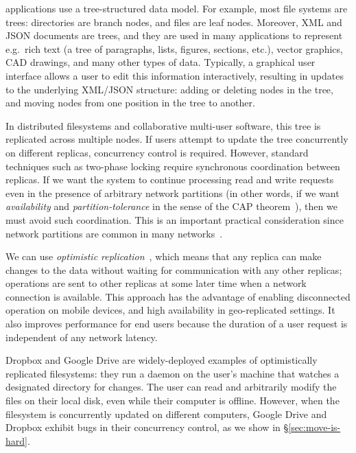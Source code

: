 \documentclass[10pt,journal,compsoc]{IEEEtran}
\begin{document}

 applications use a tree-structured data model.
For example, most file systems are trees: directories are branch nodes, and files are leaf nodes.
Moreover, XML and JSON documents are trees, and they are used in many applications to represent e.g.\ rich text (a tree of paragraphs, lists, figures, sections, etc.), vector graphics, CAD drawings, and many other types of data.
Typically, a graphical user interface allows a user to edit this information interactively, resulting in updates to the underlying XML/JSON structure: adding or deleting nodes in the tree, and moving nodes from one position in the tree to another.

In distributed filesystems and collaborative multi-user software, this tree is replicated across multiple nodes.
If users attempt to update the tree concurrently on different replicas, concurrency control is required.
However, standard techniques such as two-phase locking require synchronous coordination between replicas.
If we want the system to continue processing read and write requests even in the presence of arbitrary network partitions (in other words, if we want \emph{availability} and \emph{partition-tolerance} in the sense of the CAP theorem~\cite{Gilbert:2002il}), then we must avoid such coordination.
This is an important practical consideration since network partitions are common in many networks~\cite{Alquraan:2018wj,Bailis:2014jx}.

We can use \emph{optimistic replication}~\cite{Saito:2005jw}, which means that any replica can make changes to the data without waiting for communication with any other replicas; operations are sent to other replicas at some later time when a network connection is available.
This approach has the advantage of enabling disconnected operation on mobile devices, and high availability in geo-replicated settings.
It also improves performance for end users because the duration of a user request is independent of any network latency.

Dropbox and Google Drive are widely-deployed examples of optimistically replicated filesystems: they run a daemon on the user's machine that watches a designated directory for changes.
The user can read and arbitrarily modify the files on their local disk, even while their computer is offline.
However, when the filesystem is concurrently updated on different computers, Google Drive and Dropbox exhibit bugs in their concurrency control, as we show in \S\ref{sec:move-is-hard}.
\end{document}
